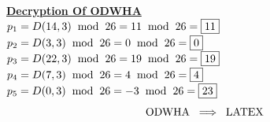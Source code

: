 \newpage
\textbf{\underline{Decryption Of ODWHA}}\\[0.2cm]
\(p_1 = D(14,3) \hspace{0.2cm} \text{mod} \hspace{0.2cm} 26 = 11 \hspace{0.2cm} \text{mod} \hspace{0.2cm} 26 = \boxed{11}\)\\[0.15cm]
\(p_2 = D(3,3) \hspace{0.2cm} \text{mod} \hspace{0.2cm} 26 = 0 \hspace{0.2cm} \text{mod} \hspace{0.2cm} 26 = \boxed{0}\)\\[0.15cm]
\(p_3 = D(22,3) \hspace{0.2cm} \text{mod} \hspace{0.2cm} 26 = 19 \hspace{0.2cm} \text{mod} \hspace{0.2cm} 26 = \boxed{19}\)\\[0.15cm]
\(p_4 = D(7,3) \hspace{0.2cm} \text{mod} \hspace{0.2cm} 26 = 4 \hspace{0.2cm} \text{mod} \hspace{0.2cm} 26 = \boxed{4}\)\\[0.15cm]
\(p_5 = D(0,3) \hspace{0.2cm} \text{mod} \hspace{0.2cm} 26 = -3 \hspace{0.2cm} \text{mod} \hspace{0.2cm} 26 = \boxed{23}\)\\[0.15cm]

\[\text{ODWHA} \hspace{0.2cm} \Longrightarrow \hspace{0.2cm} \text{LATEX} \]


\vspace{0.75cm}

